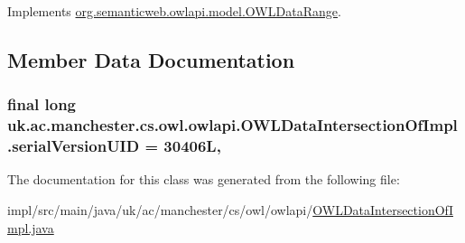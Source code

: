 Implements \hyperlink{interfaceorg_1_1semanticweb_1_1owlapi_1_1model_1_1_o_w_l_data_range_abaf13feb459a14cb55f9749191380b90}{org.\-semanticweb.\-owlapi.\-model.\-O\-W\-L\-Data\-Range}.



\subsection{Member Data Documentation}
\hypertarget{classuk_1_1ac_1_1manchester_1_1cs_1_1owl_1_1owlapi_1_1_o_w_l_data_intersection_of_impl_ad32989392359637a6e8db70c77472230}{
\subsubsection[{serial\-Version\-U\-I\-D}]{\setlength{\rightskip}{0pt plus 5cm}final long uk.\-ac.\-manchester.\-cs.\-owl.\-owlapi.\-O\-W\-L\-Data\-Intersection\-Of\-Impl.\-serial\-Version\-U\-I\-D = 30406\-L\hspace{0.3cm}{\ttfamily [static]}, {\ttfamily [private]}}}\label{classuk_1_1ac_1_1manchester_1_1cs_1_1owl_1_1owlapi_1_1_o_w_l_data_intersection_of_impl_ad32989392359637a6e8db70c77472230}


The documentation for this class was generated from the following file\-:\begin{DoxyCompactItemize}
\item 
impl/src/main/java/uk/ac/manchester/cs/owl/owlapi/\hyperlink{_o_w_l_data_intersection_of_impl_8java}{O\-W\-L\-Data\-Intersection\-Of\-Impl.\-java}\end{DoxyCompactItemize}
